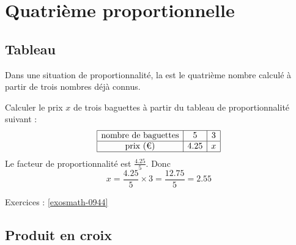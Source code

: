 \section{Quatrième proportionnelle}

\subsection{Tableau}

\begin{definition}
    Dans une situation de proportionnalité, la  est le quatrième nombre calculé à partir de trois nombres déjà connus.
\end{definition}

\begin{example}
    Calculer le prix \( x\) de trois baguettes à partir du tableau de proportionnalité suivant :
    \begin{equation*}
        \begin{array}[]{|c|c|c|}
            \hline
            \text{nombre de baguettes}&5&3\\
            \hline
            \text{prix (€)}&4.25&x\\
            \hline
        \end{array}
    \end{equation*}
    Le facteur de proportionnalité est \( \frac{ 4.25 }{ 5 }\). Donc
    \begin{equation}
        x=\frac{ 4.25 }{ 5 }\times 3=\frac{ 12.75 }{ 5 }=2.55
    \end{equation}
\end{example}

Exercices : \ref{exosmath-0944}

\subsection{Produit en croix}

